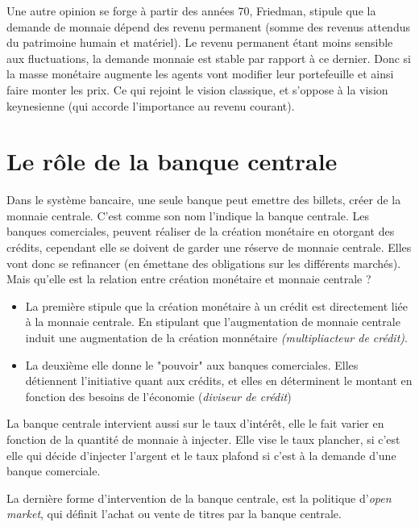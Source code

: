 Une autre opinion se forge à partir des années 70, Friedman, stipule que la demande de monnaie dépend des revenu permanent (somme des revenus attendus du 
patrimoine humain et matériel). Le revenu permanent étant moins sensible aux fluctuations, la demande monnaie est stable par rapport à ce dernier. 
Donc si la masse monétaire augmente les agents vont modifier leur portefeuille et ainsi faire monter les prix. Ce qui rejoint le vision classique, et 
s'oppose à la vision keynesienne (qui accorde l'importance au revenu courant).





\section{Le rôle de la banque centrale} %
\label{sec:le_role_de_la_banque_centrale}

Dans le système bancaire, une seule banque peut emettre des billets, créer de la monnaie centrale. C'est comme son nom l'indique la banque centrale. 
Les banques comerciales, peuvent réaliser de la création monétaire en otorgant des crédits, cependant elle se doivent de garder une réserve de monnaie
centrale. Elles vont donc se refinancer (en émettane des obligations sur les différents marchés). Mais qu'elle est la relation entre création monétaire
et monnaie centrale ? 
\begin{itemize}
	\item La première stipule que la création monétaire à un crédit est directement liée à la monnaie centrale. En stipulant que l'augmentation de monnaie centrale induit une augmentation de la création monnétaire \emph{(multipliacteur de crédit)}.
	\item La deuxième elle donne le "pouvoir" aux banques comerciales. Elles détiennent l'initiative quant aux crédits, et elles en déterminent le montant
	en fonction des besoins de l'économie (\emph{diviseur de crédit}) 
\end{itemize}

La banque centrale intervient aussi sur le taux d'intérêt, elle le fait varier en fonction de la quantité de monnaie à injecter. Elle vise le taux plancher, 
si c'est elle qui décide d'injecter l'argent et le taux plafond si c'est à la demande d'une banque comerciale. 

La dernière forme d'intervention de la banque centrale, est la politique d'\emph{open market}, qui définit l'achat ou vente de titres par la banque centrale.




